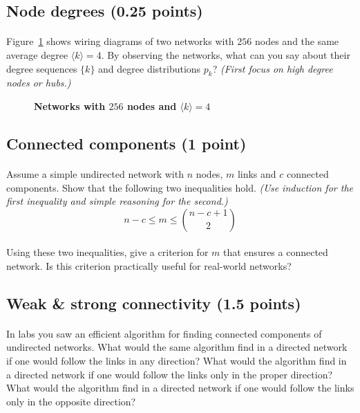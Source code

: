 \documentclass[11pt,a4paper]{article}
\newcommand{\avg}[1]{\langle#1\rangle}
\newcommand{\hint}[1]{{\it (#1)}}
\newcommand{\total}{({\color{magenta}1 point})}
\newcommand{\totals}[1]{({\color{magenta}#1 points})}
\newcommand{\figref}[1]{{\color{LimeGreen}Figure~\ref{fig:#1}}}
\begin{document}
\subsection{Node degrees \totals{0.25}}

\paragraph{} \figref{degrees} shows wiring diagrams of two networks with $256$ nodes and the same average degree $\avg{k}=4$. By observing the networks, what can you say about their degree sequences $\{k\}$ and degree distributions $p_k$? \hint{First focus on high degree nodes or hubs.} %

\begin{figure}[t] \centering
	\caption{{\bf Networks with $256$ nodes and $\avg{k}=4$}}
	\label{fig:degrees}
\end{figure}

\subsection{Connected components \total}

\paragraph{} Assume a simple undirected network with $n$ nodes, $m$ links and $c$ connected components. Show that the following two inequalities hold. \hint{Use induction for the first inequality and simple reasoning for the second.} 
$$n-c\leq m\leq {n-c+1 \choose 2}$$

\paragraph{} Using these two inequalities, give a criterion for $m$ that ensures a connected network. Is this criterion practically useful for real-world networks?

\subsection{Weak \& strong connectivity \totals{1.5}}

\paragraph{} In labs you saw an efficient algorithm for finding connected components of undirected networks. What would the same algorithm find in a directed network if one would follow the links in any direction? What would the algorithm find in a directed network if one would follow the links only in the proper direction? What would the algorithm find in a directed network if one would follow the links only in the opposite direction? 
\end{document}
